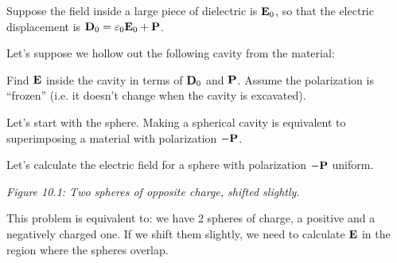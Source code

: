 \begin{example}
Suppose the field inside a large piece of dielectric is $\vb{E}_0$, so that the electric displacement is $\vb{D}_0 = \varepsilon_0 \vb{E}_0 + \vb{P}$.

Let's suppose we hollow out the following cavity from the material:
\begin{center}
\end{center}

Find $\vb{E}$ inside the cavity in terms of $\vb{D}_0$ and $\vb{P}$. Assume the polarization is ``frozen'' (i.e. it doesn't change when the cavity is excavated).

Let's start with the sphere.
Making a spherical cavity is equivalent to superimposing a material with polarization $-\vb{P}$.

Let's calculate the electric field for a sphere with polarization $-\vb{P}$ uniform.

\vspace{0.5em}
\noindent
\begin{minipage}{0.38\textwidth}
\centering
{}
\par\smallskip\small\textit{Figure 10.1: Two spheres of opposite charge, shifted slightly.}
\end{minipage}
\hfill
\begin{minipage}{0.58\textwidth}
This problem is equivalent to: we have 2 spheres of charge, a positive and a negatively charged one. If we shift them slightly, we need to calculate $\vb{E}$ in the region where the spheres overlap.


\end{minipage}
\end{example}
